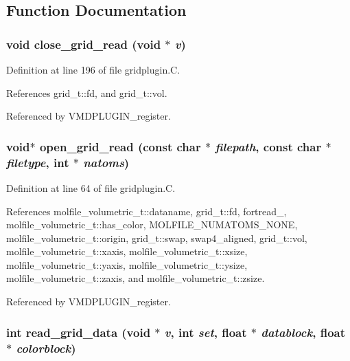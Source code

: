 \subsection{Function Documentation}
\subsubsection{\setlength{\rightskip}{0pt plus 5cm}void close\_\-grid\_\-read (void $\ast$ {\em v})\hspace{0.3cm}{\tt  [static]}}\label{gridplugin_8C_a4}




Definition at line 196 of file gridplugin.C.

References grid\_\-t::fd, and grid\_\-t::vol.

Referenced by VMDPLUGIN\_\-register.
\subsubsection{\setlength{\rightskip}{0pt plus 5cm}void$\ast$ open\_\-grid\_\-read (const char $\ast$ {\em filepath}, const char $\ast$ {\em filetype}, int $\ast$ {\em natoms})\hspace{0.3cm}{\tt  [static]}}\label{gridplugin_8C_a1}




Definition at line 64 of file gridplugin.C.

References molfile\_\-volumetric\_\-t::dataname, grid\_\-t::fd, fortread\_, molfile\_\-volumetric\_\-t::has\_\-color, MOLFILE\_\-NUMATOMS\_\-NONE, molfile\_\-volumetric\_\-t::origin, grid\_\-t::swap, swap4\_\-aligned, grid\_\-t::vol, molfile\_\-volumetric\_\-t::xaxis, molfile\_\-volumetric\_\-t::xsize, molfile\_\-volumetric\_\-t::yaxis, molfile\_\-volumetric\_\-t::ysize, molfile\_\-volumetric\_\-t::zaxis, and molfile\_\-volumetric\_\-t::zsize.

Referenced by VMDPLUGIN\_\-register.
\subsubsection{\setlength{\rightskip}{0pt plus 5cm}int read\_\-grid\_\-data (void $\ast$ {\em v}, int {\em set}, float $\ast$ {\em datablock}, float $\ast$ {\em colorblock})\hspace{0.3cm}{\tt  [static]}}\label{gridplugin_8C_a3}




